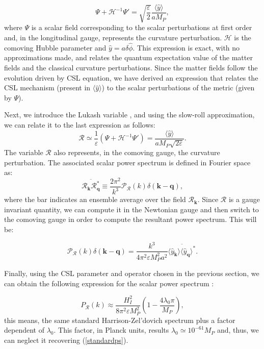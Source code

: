 \documentclass[baaa]{baaa}
\begin{document}
\begin{equation}
    \Psi + \mathcal{H}^{-1} \Psi' = \sqrt{\frac{\varepsilon}{2}}\frac{\langle \hat{y}\rangle}{a M_P} ,
\end{equation}
where $\Psi$ is a scalar field corresponding to the scalar perturbations at first order and, in the longitudinal gauge, represents the curvature perturbation. $\mathcal{H}$ is the comoving Hubble parameter and $\hat{y}=a\delta\hat{\phi}$. This expression is exact, with no approximations made, and relates the quantum expectation value of the matter fields and the classical curvature perturbations. Since the matter fields follow the evolution driven by CSL equation, we have derived an expression that relates the CSL mechanism (present in $\langle\hat{y}\rangle$) to the scalar perturbations of the metric (given by $\Psi$).

Next, we introduce the Lukash variable \citep{Lukash:1980iv}, and using the slow-roll approximation, we can relate it to the last expression as follows:
\begin{equation}
    \mathcal{R} \simeq \frac{1}{\varepsilon} (\Psi + \mathcal{H}^{-1} \Psi' ) = \frac{\langle \hat{y}\rangle}{a M_P\sqrt{2\varepsilon}} .
\end{equation}
The variable $\mathcal{R}$ also represents, in the comoving gauge, the curvature perturbation. The associated scalar power spectrum is defined in Fourier space as:
\begin{equation}
    \overline{\mathcal{R}_{\mathbf{k}}\mathcal{R}^*_{\mathbf{q}}} \equiv \frac{2\pi^2}{k^3} \mathcal{P}_{\mathcal{R}}(k)\delta(\mathbf{k}-\mathbf{q}) ,
\end{equation}
where the bar indicates an ensemble average over the field $\mathcal{R}_\mathbf{k}$. Since $\mathcal{R}$ is a gauge invariant quantity, we can compute it in the Newtonian gauge and then switch to the comoving gauge in order to compute the resultant power spectrum. This will be:

\begin{equation}
    \mathcal{P}_{\mathcal{R}}(k)\delta(\mathbf{k}-\mathbf{q})= \frac{k^3}{4\pi^2\varepsilon M^2_P a^2} \overline{\langle\hat{y}_{\mathbf{k}}\rangle\langle\hat{y}_{\mathbf{q}}\rangle^*}.
\end{equation}

Finally, using the CSL parameter and operator chosen in the previous section, we can obtain the following expression for the scalar power spectrum \citep{ocampotesis}:

\begin{equation}
    P_\mathcal{R}(k) \approx \frac{H_I^2}{8\pi^2\varepsilon M_P^2} \left ( 1 - \frac{4 \lambda_0\pi}{M_P}\right),
\end{equation}
this means, the same standard Harrison-Zel'dovich spectrum plus a factor dependent of $\lambda_0$. This factor, in Planck units, results $\lambda_0\simeq 10^{-61}M_P$ and, thus, we can neglect it recovering (\ref{standardps}). 
\end{document}
